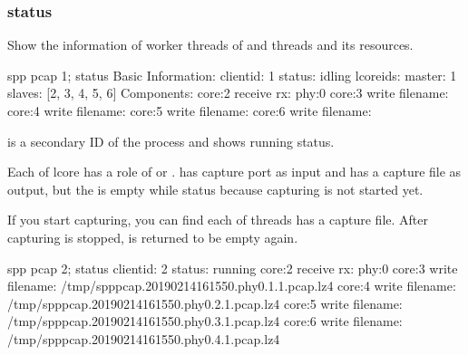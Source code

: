 \documentclass[a4paper,11pt,openany,oneside,english]{sphinxmanual}
\begin{document}
\subsubsection{status}
\label{\detokenize{commands/secondary/spp_pcap:status}}\label{\detokenize{commands/secondary/spp_pcap:commands-spp-pcap-status}}
Show the information of worker threads of  and  threads
and its resources.

\begin{sphinxVerbatim}[commandchars=\\\{\},formatcom=\footnotesize]
spp \PYGZgt{} pcap 1; status
Basic Information:
  \PYGZhy{} client\PYGZhy{}id: 1
  \PYGZhy{} status: idling
  \PYGZhy{} lcore\PYGZus{}ids:
    \PYGZhy{} master: 1
    \PYGZhy{} slaves: [2, 3, 4, 5, 6]
Components:
  \PYGZhy{} core:2 receive
    \PYGZhy{} rx: phy:0
  \PYGZhy{} core:3 write
    \PYGZhy{} filename:
  \PYGZhy{} core:4 write
    \PYGZhy{} filename:
  \PYGZhy{} core:5 write
    \PYGZhy{} filename:
  \PYGZhy{} core:6 write
    \PYGZhy{} filename:
\end{sphinxVerbatim}

 is a secondary ID of the process and  shows
running status.

Each of lcore has a role of  or .
 has capture port as input and  has a capture file
as output, but the  is empty while  status
because capturing is not started yet.

If you start capturing, you can find each of  threads has a
capture file. After capturing is stopped,  is returned to
be empty again.

\begin{sphinxVerbatim}[commandchars=\\\{\},formatcom=\footnotesize]
spp \PYGZgt{} pcap 2; status
  \PYGZhy{} client\PYGZhy{}id: 2
  \PYGZhy{} status: running
  \PYGZhy{} core:2 receive
    \PYGZhy{} rx: phy:0
  \PYGZhy{} core:3 write
    \PYGZhy{} filename: /tmp/spp\PYGZus{}pcap.20190214161550.phy0.1.1.pcap.lz4
  \PYGZhy{} core:4 write
    \PYGZhy{} filename: /tmp/spp\PYGZus{}pcap.20190214161550.phy0.2.1.pcap.lz4
  \PYGZhy{} core:5 write
    \PYGZhy{} filename: /tmp/spp\PYGZus{}pcap.20190214161550.phy0.3.1.pcap.lz4
  \PYGZhy{} core:6 write
    \PYGZhy{} filename: /tmp/spp\PYGZus{}pcap.20190214161550.phy0.4.1.pcap.lz4
\end{sphinxVerbatim}
\end{document}
